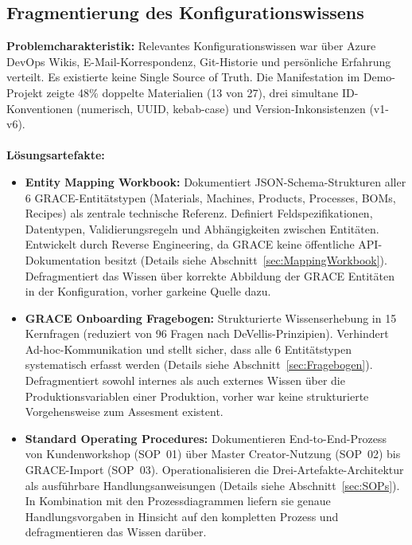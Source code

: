 \subsection{Fragmentierung des Konfigurationswissens}
\label{subsec:FragmentierungEval}

\textbf{Problemcharakteristik:} Relevantes Konfigurationswissen war über Azure DevOps Wikis, E-Mail-Korrespondenz, Git-Historie und persönliche Erfahrung verteilt. Es existierte keine Single Source of Truth. Die Manifestation im Demo-Projekt zeigte 48\% doppelte Materialien (13 von 27), drei simultane ID-Konventionen (numerisch, UUID, kebab-case) und Version-Inkonsistenzen (v1-v6).
\\\\
\noindent \textbf{Lösungsartefakte:}

\begin{itemize}
    \item \textbf{Entity Mapping Workbook:} Dokumentiert JSON-Schema-Strukturen aller 6 GRACE-Entitätstypen (Materials, Machines, Products, Processes, BOMs, Recipes) als zentrale technische Referenz. Definiert Feldspezifikationen, Datentypen, Validierungsregeln und Abhängigkeiten zwischen Entitäten. Entwickelt durch Reverse Engineering, da GRACE keine öffentliche API-Dokumentation besitzt (Details siehe Abschnitt~\ref{sec:MappingWorkbook}). Defragmentiert das Wissen über korrekte Abbildung der GRACE Entitäten in der Konfiguration, vorher garkeine Quelle dazu. 

    \item \textbf{GRACE Onboarding Fragebogen:} Strukturierte Wissenserhebung in 15 Kernfragen (reduziert von 96 Fragen nach DeVellis-Prinzipien). Verhindert Ad-hoc-Kommunikation und stellt sicher, dass alle 6 Entitätstypen systematisch erfasst werden (Details siehe Abschnitt~\ref{sec:Fragebogen}). Defragmentiert sowohl internes als auch externes Wissen über die Produktionsvariablen einer Produktion, vorher war keine strukturierte Vorgehensweise zum Assesment existent. 

    \item \textbf{Standard Operating Procedures:} Dokumentieren End-to-End-Prozess von Kundenworkshop (SOP~01) über Master Creator-Nutzung (SOP~02) bis GRACE-Import (SOP~03). Operationalisieren die Drei-Artefakte-Architektur als ausführbare Handlungsanweisungen (Details siehe Abschnitt~\ref{sec:SOPs}). In Kombination mit den Prozessdiagrammen liefern sie genaue Handlungsvorgaben in Hinsicht auf den kompletten Prozess und defragmentieren das Wissen darüber.
\end{itemize}

